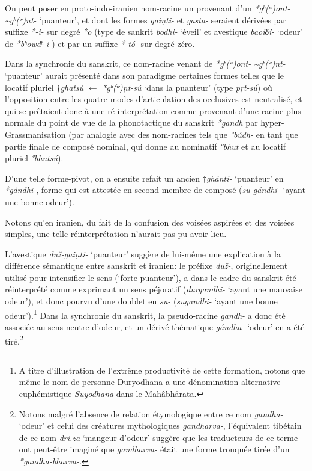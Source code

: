 \documentclass[11pt]{article}
\newcommand{\ipa}[1]{{\phon\textit{#1}}}
\begin{document}
On peut poser en proto-indo-iranien nom-racine  un provenant d'un \ipa{*gʰ(ʷ)ont- \textasciitilde *gʰ(ʷ)nt-} `puanteur', et dont les formes \ipa{gaiṇti-} et  \ipa{gasta-} seraient dérivées par suffixe \ipa{*-i-} sur degré \ipa{*o} (type de sankrit \ipa{bodhi-} `éveil' et avestique \ipa{baoiδi-} `odeur' de \ipa{*bʰowdʰ-i-}) et par un suffixe \ipa{*-tó-} sur degré zéro.

Dans la synchronie du sanskrit, ce nom-racine venant de \ipa{*gʰ(ʷ)ont- \textasciitilde *gʰ(ʷ)nt-} `puanteur' aurait présenté dans son paradigme certaines formes telles que le locatif pluriel $\dagger$\ipa{ghatsú} $\leftarrow$ \ipa{*gʰ(ʷ)ṇt-sú} `dans la puanteur' (type \ipa{pṛt-sú}) où l'opposition entre les quatre modes d'articulation des occlusives est neutralisé, et qui se prêtaient donc à une ré-interprétation comme provenant d'une racine plus normale du point de vue de la phonotactique du sanskrit \ipa{*gandh} par hyper-Grassmanisation (par analogie avec des nom-racines tels que \ipa{°búdh-} en tant que partie finale de composé nominal, qui donne au nominatif \ipa{°bhut} et au locatif pluriel \ipa{°bhutsú}). 

D'une telle forme-pivot, on a ensuite refait un ancien $\dagger$\ipa{ghánti-} `puanteur' en \ipa{*gándhi-}, forme qui est attestée en second membre de composé (\ipa{su-gándhi-} `ayant une bonne odeur').

Notons qu'en iranien, du fait de la confusion des voisées aspirées et des voisées simples, une telle réinterprétation n'aurait pas pu avoir lieu.

L'avestique \ipa{duž-gaiṇti-} `puanteur' suggère de lui-même une explication à la différence sémantique entre sanskrit et iranien: le préfixe \ipa{duž-}, originellement utilisé pour intensifier le sens (`forte puanteur'), a dans le cadre du sanskrit été réinterprété comme exprimant un sens péjoratif (\ipa{durgandhi-} `ayant une mauvaise odeur'), et donc pourvu d'une doublet en \ipa{su-} (\ipa{sugandhi-} `ayant une bonne odeur').\footnote{A titre d'illustration de l'extrême productivité de cette formation, notons que même le nom de personne Duryodhana a  une dénomination alternative euphémistique \textit{Suyodhana} dans le Mahâbhârata.} Dans la synchronie du sanskrit, la pseudo-racine \ipa{gandh-} a donc été associée au sens neutre d'odeur, et un dérivé thématique \ipa{gándha-} `odeur' en a été tiré.\footnote{Notons malgré l'absence de relation étymologique entre ce nom \ipa{gandha-} `odeur' et celui des créatures mythologiques \ipa{gandharva-}, l'équivalent tibétain de ce nom \ipa{dri.za} `mangeur d'odeur' suggère que les traducteurs de ce terme ont peut-être imaginé que \ipa{gandharva-} était une forme tronquée tirée d'un \ipa{*gandha-bharva-}.}
\end{document}
